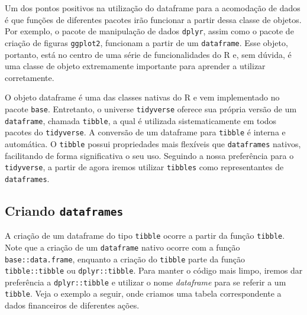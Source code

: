 \documentclass[
  11pt,
]{book}
\begin{document}
Um dos pontos positivos na utilização do dataframe para a acomodação de dados é que funções de diferentes pacotes irão funcionar a partir dessa classe de objetos. Por exemplo, o pacote de manipulação de dados \texttt{dplyr}, assim como o pacote de criação de figuras \texttt{ggplot2}, funcionam a partir de um \texttt{dataframe}. Esse objeto, portanto, está no centro de uma série de funcionalidades do R e, sem dúvida, é uma classe de objeto extremamente importante para aprender a utilizar corretamente.

O objeto dataframe é uma das classes nativas do R e vem implementado no pacote \texttt{base}. Entretanto, o universe \texttt{tidyverse} oferece sua própria versão de um \texttt{dataframe}, chamada \texttt{tibble}, a qual é utilizada sistematicamente em todos pacotes do \texttt{tidyverse}. A conversão de um dataframe para \texttt{tibble} é interna e automática. O \texttt{tibble} possui propriedades mais flexíveis que \texttt{dataframes} nativos, facilitando de forma significativa o seu uso. Seguindo a nossa preferência para o \texttt{tidyverse}, a partir de agora iremos utilizar \texttt{tibbles} como representantes de \texttt{dataframes}.

\hypertarget{criando-dataframes}{%
\subsection{\texorpdfstring{Criando \texttt{dataframes}}{Criando dataframes}}\label{criando-dataframes}}

A criação de um dataframe do tipo \texttt{tibble} ocorre a partir da função \texttt{tibble}. Note que a criação de um \texttt{dataframe} nativo ocorre com a função \texttt{base::data.frame}, enquanto a criação do \texttt{tibble} parte da função \texttt{tibble::tibble} ou \texttt{dplyr::tibble}. Para manter o código mais limpo, iremos dar preferência a \texttt{dplyr::tibble} e utilizar o nome \emph{dataframe} para se referir a um \texttt{tibble}. Veja o exemplo a seguir, onde criamos uma tabela correspondente a dados financeiros de diferentes ações.    
\end{document}
